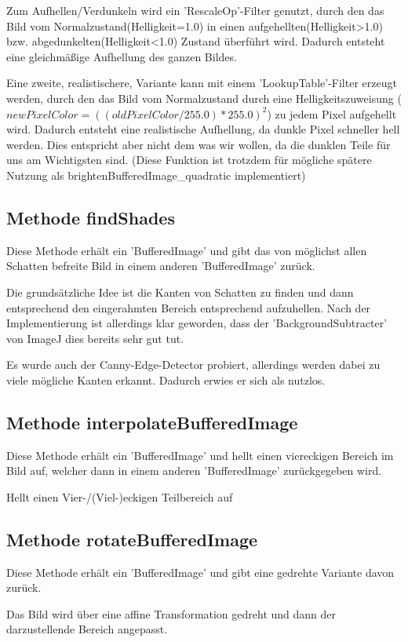 Zum Aufhellen/Verdunkeln wird ein 'RescaleOp'-Filter genutzt, durch den das Bild vom Normalzustand(Helligkeit=1.0) in einen aufgehellten(Helligkeit>1.0) bzw. abgedunkelten(Helligkeit<1.0) Zustand überführt wird.
Dadurch entsteht eine gleichmäßige Aufhellung des ganzen Bildes.

Eine zweite, realistischere, Variante kann mit einem 'LookupTable'-Filter erzeugt werden, durch den das Bild vom Normalzustand durch eine Helligkeitszuweisung ($newPixelColor = ((oldPixelColor/255.0) * 255.0)^2$) zu jedem Pixel aufgehellt wird.
Dadurch entsteht eine realistische Aufhellung, da dunkle Pixel schneller hell werden. Dies entspricht aber nicht dem was wir wollen, da die dunklen Teile für uns am Wichtigsten sind. (Diese Funktion ist trotzdem für mögliche spätere Nutzung als brightenBufferedImage\_quadratic implementiert)


\subsection*{Methode findShades}
Diese Methode erhält ein 'BufferedImage' und gibt das von möglichst allen Schatten befreite Bild in einem anderen 'BufferedImage' zurück.

Die grundsätzliche Idee ist die Kanten von Schatten zu finden und dann entsprechend den eingerahmten Bereich entsprechend aufzuhellen.
Nach der Implementierung ist allerdings klar geworden, dass der 'BackgroundSubtracter' von ImageJ dies bereits sehr gut tut.

Es wurde auch der Canny-Edge-Detector probiert, allerdings werden dabei zu viele mögliche Kanten erkannt. Dadurch erwies er sich als nutzlos.


\subsection*{Methode interpolateBufferedImage}
Diese Methode erhält ein 'BufferedImage' und hellt einen viereckigen Bereich im Bild auf, welcher dann in einem anderen 'BufferedImage' zurückgegeben wird.

Hellt einen Vier-/(Viel-)eckigen Teilbereich auf


\subsection*{Methode rotateBufferedImage}
Diese Methode erhält ein 'BufferedImage' und gibt eine gedrehte Variante davon zurück.

Das Bild wird über eine affine Transformation gedreht und dann der darzustellende Bereich angepasst.


